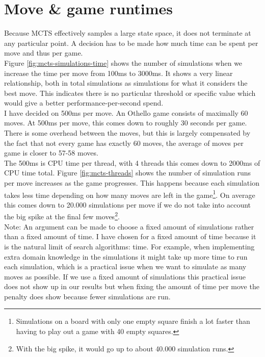 \documentclass[
11pt, %
english, %
singlespacing, %
headsepline, %
]{MastersDoctoralThesis} %
\begin{document}
\section{Move \& game runtimes}
Because MCTS effectively samples a large state space, it does not terminate at any particular point. A decision has to be made how much time can be spent per move and thus per game.\\

Figure \ref{fig:mcts-simulations-time} shows the number of simulations when we increase the time per move from 100ms to 3000ms. It shows a very linear relationship, both in total simulations as simulations for what it considers the best move. This indicates there is no particular threshold or specific value which would give a better performance-per-second spend.\\

I have decided on 500ms per move. An Othello game consists of maximally 60 moves. At 500ms per move, this comes down to roughly 30 seconds per game. There is some overhead between the moves, but this is largely compensated by the fact that not every game has exactly 60 moves, the average of moves per game is closer to 57-58 moves.\\

The 500ms is CPU time per thread, with 4 threads this comes down to 2000ms of CPU time total. Figure \ref{fig:mcts-threads} shows the number of simulation runs per move increases as the game progresses. This happens because each simulation takes less time depending on how many moves are left in the game\footnote{Simulations on a board with only one empty square finish a lot faster than having to play out a game with 40 empty squares.}. On average this comes down to 20.000 simulations per move if we do not take into account the big spike at the final few moves\footnote{With the big spike, it would go up to about 40.000 simulation runs.}.\\

Note: An argument can be made to choose a fixed amount of simulations rather than a fixed amount of time. I have chosen for a fixed amount of time because it is the natural limit of search algorithms: time. For example, when implementing extra domain knowledge in the simulations it might take up more time to run each simulation, which is a practical issue when we want to simulate as many moves as possible. If we use a fixed amount of simulations this practical issue does not show up in our results but when fixing the amount of time per move the penalty does show because fewer simulations are run.
\end{document}
